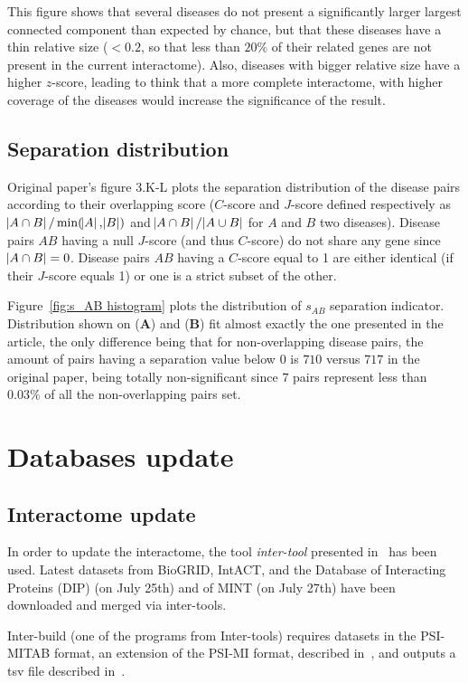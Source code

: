 \documentclass[letterpaper]{article}
\begin{document}
	This figure shows that several diseases do not present a significantly larger largest connected component
	than expected by chance, but that these diseases have a thin relative size ($< 0.2$, so that less than $20\%$
	of their related genes are not present in the current interactome). Also, diseases with bigger relative size
	have a higher $z$-score, leading to think that a more complete interactome, with higher coverage of the diseases
	would increase the significance of the result.

	\subsection{Separation distribution}
	Original paper's figure 3.K-L plots the separation distribution of the disease pairs according to their
	overlapping score ($C$-score and $J$-score defined respectively as $\abs {A \cap B}/\min(\abs A, \abs B)$ and
	$\abs {A \cap B}/\abs {A \cup B}$ for $A$ and $B$ two diseases). Disease pairs $AB$ having a null $J$-score
	(and thus $C$-score) do not share any gene since $\abs {A \cap B} = 0$. Disease pairs $AB$ having a $C$-score
	equal to 1 are either identical (if their $J$-score equals 1) or one is a strict subset of the other.

	Figure~\ref{fig:s_AB histogram} plots the distribution of $s_{AB}$ separation indicator.
	Distribution shown on ({\bf A}) and ({\bf B}) fit almost exactly the one presented in the article, the only difference
	being that for non-overlapping disease pairs, the amount of pairs having a separation value below 0 is $710$
	versus $717$ in the original paper, being totally non-significant since $7$ pairs represent less than
	$0.03\%$ of all the non-overlapping pairs set.


\section{Databases update}

	\subsection{Interactome update}
	In order to update the interactome, the tool \textit{inter-tool} presented in~\cite{inter-tools} has
	been used. Latest datasets from BioGRID, IntACT, and the Database of Interacting Proteins (DIP)
	(on July 25th) and of MINT (on July 27th) have been downloaded and merged via inter-tools.

	Inter-build (one of the programs from Inter-tools) requires datasets in the PSI-MITAB format, an extension of the
	PSI-MI format, described in~\cite{MITABFormat}, and outputs a tsv file described in~\cite{inter-tools}.
\end{document}
